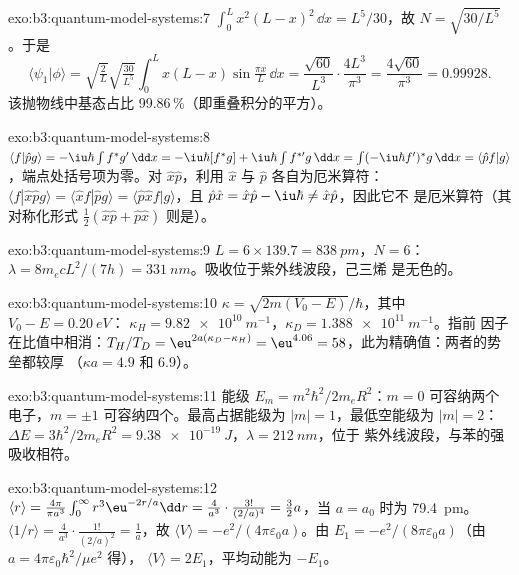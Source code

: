 \begin{solution}{exo:b3:quantum-model-systems:7}
$\int_0^Lx^2(L - x)^2\,\dd x = L^5/30$，故 $N = \sqrt{30/L^5}$。于是
\[
\langle\psi_1|\phi\rangle = \sqrt{\tfrac2L}\sqrt{\tfrac{30}{L^5}}\int_0^Lx(L -
x)\sin\tfrac{\pi x}{L}\,\dd x = \frac{\sqrt{60}}{L^3}\cdot\frac{4L^3}{\pi^3} =
\frac{4\sqrt{60}}{\pi^3} = 0.99928 .
\]
该抛物线中基态占比 99.86\,\%（即重叠积分的平方）。
\end{solution}

\begin{solution}{exo:b3:quantum-model-systems:8}
$\langle f|\hat pg\rangle = -\iu\hbar\int f^*g'\,\dd x = -\iu\hbar[f^*g] +
\iu\hbar\int f^{*\prime}g\,\dd x = \int(-\iu\hbar f')^*g\,\dd x = \langle\hat
pf|g\rangle$，端点处括号项为零。对 $\hat x\hat p$，利用 $\hat x$ 与 $\hat p$ 各自为厄米算符：
$\langle f|\hat x\hat pg\rangle = \langle\hat xf|\hat pg\rangle = \langle\hat p\hat
xf|g\rangle$，且 $\hat p\hat x = \hat x\hat p - \iu\hbar \ne \hat x\hat p$，因此它不
是厄米算符（其对称化形式 $\frac12(\hat x\hat p + \hat p\hat x)$ 则是）。
\end{solution}

\begin{solution}{exo:b3:quantum-model-systems:9}
$L = 6 \times 139.7 = \qty{838}{pm}$，$N = 6$：$\lambda = 8m_ecL^2/(7h) =
\qty{331}{nm}$。吸收位于紫外线波段，己三烯
是无色的。
\end{solution}

\begin{solution}{exo:b3:quantum-model-systems:10}
$\kappa = \sqrt{2m(V_0 - E)}/\hbar$，其中 $V_0 - E = \qty{0.20}{eV}$：
$\kappa_H = \qty{9.82e10}{m^{-1}}$，$\kappa_D = \qty{1.388e11}{m^{-1}}$。指前
因子在比值中相消：$T_H/T_D = \eu^{2a(\kappa_D - \kappa_H)} =
\eu^{4.06} = 58$，此为精确值：两者的势垒都较厚
（$\kappa a = 4.9$ 和 6.9）。
\end{solution}

\begin{solution}{exo:b3:quantum-model-systems:11}
能级 $E_m = m^2\hbar^2/2m_eR^2$：$m = 0$ 可容纳两个电子，$m = \pm1$
可容纳四个。最高占据能级为 $|m| = 1$，最低空能级为 $|m| = 2$：$\Delta E =
3\hbar^2/2m_eR^2 = \qty{9.38e-19}{J}$，$\lambda = \qty{212}{nm}$，位于
紫外线波段，与苯的强吸收相符。
\end{solution}

\begin{solution}{exo:b3:quantum-model-systems:12}
$\langle r\rangle = \frac{4\pi}{\pi a^3}\int_0^\infty r^3\eu^{-2r/a}\dd r =
\frac{4}{a^3}\cdot\frac{3!}{(2/a)^4} = \frac32a$，当 $a = a_0$ 时为 \qty{79.4}{pm}。
$\langle 1/r\rangle = \frac{4}{a^3}\cdot\frac{1!}{(2/a)^2} = \frac1a$，故
$\langle V\rangle = -e^2/(4\pi\varepsilon_0a)$。由 $E_1 =
-e^2/(8\pi\varepsilon_0a)$（由 $a = 4\pi\varepsilon_0\hbar^2/\mu e^2$ 得），
$\langle V\rangle = 2E_1$，平均动能为 $-E_1$。
\end{solution}

